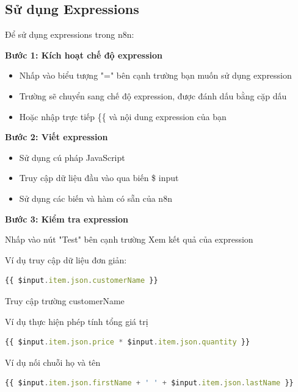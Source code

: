 \subsection{Sử dụng Expressions}
Để sử dụng expressions trong n8n:

\textbf{Bước 1: Kích hoạt chế độ expression}
\begin{itemize}
    \item Nhấp vào biểu tượng "=" bên cạnh trường bạn muốn sử dụng expression
    \item Trường sẽ chuyển sang chế độ expression, được đánh dấu bằng cặp dấu {{ }}
    \item Hoặc nhập trực tiếp \{\{ và nội dung expression của bạn
\end{itemize}

\textbf{Bước 2: Viết expression}
\begin{itemize}
    \item Sử dụng cú pháp JavaScript
    \item Truy cập dữ liệu đầu vào qua biến \$ input
    \item Sử dụng các biến và hàm có sẵn của n8n
\end{itemize}

\textbf{Bước 3: Kiểm tra expression}

Nhấp vào nút "Test" bên cạnh trường
Xem kết quả của expression

Ví dụ truy cập dữ liệu đơn giản:
\begin{lstlisting}[language = Javascript]    
{{ $input.item.json.customerName }}
\end{lstlisting}

Truy cập trường customerName

Ví dụ thực hiện phép tính tổng giá trị
\begin{lstlisting}[language = Javascript]    
{{ $input.item.json.price * $input.item.json.quantity }} 
\end{lstlisting}

Ví dụ nối chuỗi họ và tên
\begin{lstlisting}[language = Javascript]    
{{ $input.item.json.firstName + ' ' + $input.item.json.lastName }}
\end{lstlisting}
